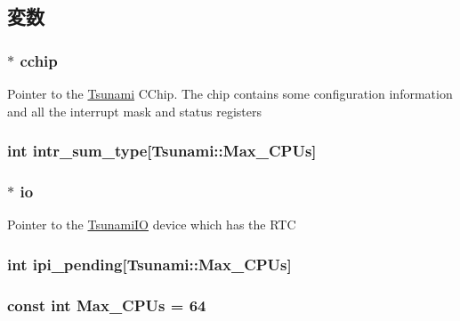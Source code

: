 \subsection{変数}
\hypertarget{classTsunami_afd150142ed1f45226be23c3dfc00fa79}{
\subsubsection[{cchip}]{$\ast$ {\bf cchip}}}
\label{classTsunami_afd150142ed1f45226be23c3dfc00fa79}
Pointer to the \hyperlink{classTsunami}{Tsunami} CChip. The chip contains some configuration information and all the interrupt mask and status registers \hypertarget{classTsunami_a10691edeecd1b6fe8a38b465bdf4c41d}{
\subsubsection[{intr\_\-sum\_\-type}]{\setlength{\rightskip}{0pt plus 5cm}int {\bf intr\_\-sum\_\-type}\mbox{[}{\bf Tsunami::Max\_\-CPUs}\mbox{]}}}
\label{classTsunami_a10691edeecd1b6fe8a38b465bdf4c41d}
\hypertarget{classTsunami_a9d42ea935a6d6bddb63076040468dfe4}{
\subsubsection[{io}]{$\ast$ {\bf io}}}
\label{classTsunami_a9d42ea935a6d6bddb63076040468dfe4}
Pointer to the \hyperlink{classTsunami_1_1TsunamiIO}{TsunamiIO} device which has the RTC \hypertarget{classTsunami_ae3bd11c65a338e493ad9b0df87a6b34c}{
\subsubsection[{ipi\_\-pending}]{\setlength{\rightskip}{0pt plus 5cm}int {\bf ipi\_\-pending}\mbox{[}{\bf Tsunami::Max\_\-CPUs}\mbox{]}}}
\label{classTsunami_ae3bd11c65a338e493ad9b0df87a6b34c}
\hypertarget{classTsunami_ab15ce4af0fe2c47746a30bafa34ced51}{
\subsubsection[{Max\_\-CPUs}]{\setlength{\rightskip}{0pt plus 5cm}const int {\bf Max\_\-CPUs} = 64}}
